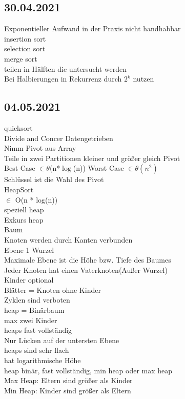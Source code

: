 \documentclass{article}
\begin{document}
	\subsection*{30.04.2021}
	Exponentieller Aufwand in der Praxis nicht handhabbar \\
	insertion sort \\
	selection sort \\
	merge sort \\
	teilen in Hälften die untersucht werden \\
	Bei Halbierungen in Rekurrenz durch $2^k$ nutzen \\
	\subsection*{04.05.2021}
	quicksort \\
	Divide and Concer Datengetrieben \\
	Nimm Pivot aus Array \\
	Teile in zwei Partitionen kleiner und größer gleich Pivot \\
	Best Case $\in$$\theta$(n*$\log$(n))
	Worst Case $\in \theta(n^2)$ \\
	Schlüssel ist die Wahl des Pivot \\
	HeapSort \\
	$\in$ O(n * log(n)) \\
	speziell heap \\
	Exkurs heap \\
	Baum \\
	Knoten werden durch Kanten verbunden  \\
	Ebene 1 Wurzel \\
	Maximale Ebene ist die Höhe bzw. Tiefe des Baumes  \\
	Jeder Knoten hat einen Vaterknoten(Außer Wurzel) \\
	Kinder optional \\
	Blätter = Knoten ohne Kinder \\
	Zyklen sind verboten \\
	heap = Binärbaum \\
	max zwei Kinder \\
	heaps fast vollständig \\
	Nur Lücken auf der untersten Ebene \\
	heaps sind sehr flach \\
	hat logarithmische Höhe \\
	heap binär, fast vollständig, min heap oder max heap \\
	Max Heap: Eltern sind größer als Kinder \\
	Min Heap: Kinder sind größer als Eltern \\
\end{document}
